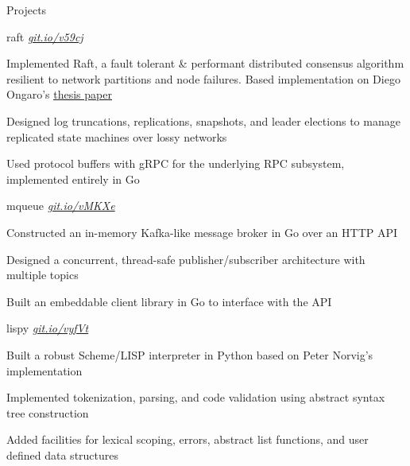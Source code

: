 \documentclass{resume} %
\begin{document}
\begin{rSection}{Projects}
  
  \begin{rSubsection}{raft}
	  {\em {\href{http://github.com/ridwanmsharif/raft}
		    {git.io/v59cj}}}
	  {}

    \item Implemented Raft, a fault tolerant \& performant distributed
      consensus algorithm resilient to network partitions and node failures.
      Based implementation on Diego Ongaro's
      \href{https://raft.github.io/raft.pdf}{\underline{thesis paper}}
    \item Designed log truncations, replications, snapshots, and leader
      elections to manage replicated state machines over lossy networks
    \item Used protocol buffers with gRPC for the underlying RPC subsystem,
      implemented entirely in Go
      
  \end{rSubsection}

  \begin{rSubsection}{mqueue}
	  {\em {\href{http://github.com/ridwanmsharif/mqueue}
		    {git.io/vMKXe}}}
	  {}

    \item Constructed an in-memory Kafka-like message broker in Go over an HTTP API
    \item Designed a concurrent, thread-safe publisher/subscriber architecture
      with multiple topics
    \item Built an embeddable client library in Go to interface with the API
        
  \end{rSubsection}

  \begin{rSubsection}{lispy}
	  {\em {\href{http://github.com/ridwanmsharif/lispy}
		    {git.io/vyfVt}}}
	  {}

    \item Built a robust Scheme/LISP interpreter in Python based on Peter
      Norvig's implementation
    \item Implemented tokenization, parsing, and code validation using abstract
      syntax tree construction
    \item Added facilities for lexical scoping, errors, abstract list
      functions, and user defined data structures
  \end{rSubsection}


\end{rSection}
\end{document}
